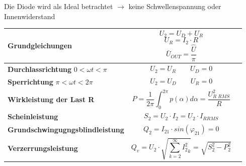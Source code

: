 Die Diode wird als Ideal betrachtet $ \rightarrow $ keine Schwellenspannung oder Innenwiderstand
\begin{longtable}{| p{} | p{} | p{} |} %
    \hline
    \textbf{Grundgleichungen}&
    \[ U_2 = U_D + U_R \]
    \[ U_R = I_2 \cdot R\]
    \[ \bar{U}_{OUT} = \dfrac{\hat{U}}{\pi}\]&\\
    \hline
    \textbf{Durchlassrichtung}\newline
    $ 0 < \omega t < \pi $&
    \vspace{-0.3cm}\[ U_2 = U_R \qquad U_D = 0 \] \vspace{-0.3cm}&\\
    \hline   
    \textbf{Sperrichtung}\newline
    $ \pi < \omega t < 2\pi $&
     \vspace{-0.3cm}\[ U_2=U_D \qquad U_R = 0 \] \vspace{-0.3cm}&\\
    \hline
    
    \textbf{Wirkleistung der Last R}&
    \[ P=\frac{1}{2\pi} \int_{0}^{2\pi} p(\alpha) d\alpha = \dfrac{U_{R\;RMS}^2}{R} \]&
    \\ \hline
    
    \textbf{Scheinleistung}&
    \[ S_2 = U_2 \cdot I_2 = U_2 \cdot I_{R RMS} \]&
    \\ \hline
        
    \textbf{Grundschwingugngsblindleistung}&
    \[ Q_2 = I_{2 1} \cdot sin(\varphi_{2 1}) = 0 \]&
    \\ \hline    
    
        
    \textbf{Verzerrungsleistung}&
    \[ Q_v = U_2 \cdot \sqrt{\sum_{k=2}^{\infty} {I_2^2}_k} = \sqrt{S_2^2 - P_2^2} \]&
    \\ \hline

\end{longtable}

